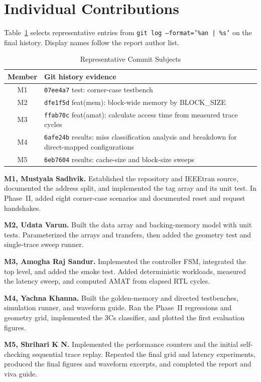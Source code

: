 \documentclass[conference]{IEEEtran}
\begin{document}
\section{Individual Contributions}
Table~\ref{tab:contributions} selects representative entries from \texttt{git log --format='\%an | \%s'} on the final history. Display names follow the report author list.

\begin{table}[!t]
\caption{Representative Commit Subjects}
\label{tab:contributions}
\centering
\small
\begin{tabular}{@{}cp{}@{}}
\toprule
Member & Git history evidence \\
\midrule
M1 & \texttt{07ee4a7} test: corner-case testbench \\
M2 & \texttt{dfe1f5d} feat(mem): block-wide memory by BLOCK\_SIZE \\
M3 & \texttt{ffab70c} feat(amat): calculate access time from measured trace cycles \\
M4 & \texttt{6afe24b} results: miss classification analysis and breakdown for direct-mapped configurations \\
M5 & \texttt{6eb7604} results: cache-size and block-size sweeps \\
\bottomrule
\end{tabular}
\end{table}

\textbf{M1, Mustyala Sadhvik.} Established the repository and IEEEtran source, documented the address split, and implemented the tag array and its unit test. In Phase~II, added eight corner-case scenarios and documented reset and request handshakes.

\textbf{M2, Udata Varun.} Built the data array and backing-memory model with unit tests. Parameterized the arrays and transfers, then added the geometry test and single-trace sweep runner.

\textbf{M3, Amogha Raj Sandur.} Implemented the controller FSM, integrated the top level, and added the smoke test. Added deterministic workloads, measured the latency sweep, and computed AMAT from elapsed RTL cycles.

\textbf{M4, Yachna Khanna.} Built the golden-memory and directed testbenches, simulation runner, and waveform guide. Ran the Phase~II regressions and geometry grid, implemented the 3Cs classifier, and plotted the first evaluation figures.

\textbf{M5, Shrihari K N.} Implemented the performance counters and the initial self-checking sequential trace replay. Repeated the final grid and latency experiments, produced the final figures and waveform excerpts, and completed the report and viva guide.
\end{document}
